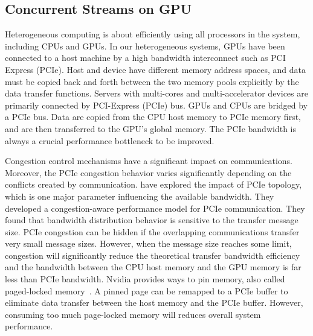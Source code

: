\subsection{Concurrent Streams on GPU}\label{sec:StreamGPU}
Heterogeneous computing is about efficiently using all processors in the system, including CPUs and GPUs.  In our heterogeneous systems, GPUs have been connected to a host machine by a high bandwidth interconnect such as PCI Express (PCIe). Host and device have different memory address spaces, and data must be copied back and forth between the two memory pools explicitly by the data transfer functions. 
Servers with multi-cores and multi-accelerator devices are primarily connected by PCI-Express (PCIe) bus. GPUs and CPUs are bridged by a PCIe bus. Data are copied from the CPU host memory to PCIe memory first, and are then transferred to the GPU's global memory. The PCIe bandwidth is always a crucial performance bottleneck to be improved. 

Congestion control mechanisms have a significant impact on communications. Moreover, the PCIe congestion behavior varies significantly depending on the conflicts created by communication. \cite{Martinasso16} have explored the impact of PCIe topology, which is one major parameter influencing the available bandwidth. They developed a congestion-aware performance model for PCIe communication. They found that bandwidth distribution behavior is sensitive to the transfer message size. PCIe congestion can be hidden if the overlapping communications transfer very small message sizes. However, when the message size reaches some limit, congestion will significantly reduce the theoretical transfer bandwidth efficiency and the bandwidth between the CPU host memory and the GPU memory is far less than PCIe bandwidth. Nvidia provides ways to pin memory, also called paged-locked memory~\citep{CUDAGuide}. A pinned page can be remapped to a PCIe buffer to eliminate data transfer between the host memory and the PCIe buffer. However, consuming too much page-locked memory will reduces overall system performance.

